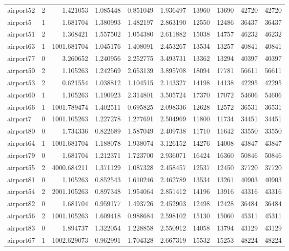 \begin{longtable}{|l|r|r|r|r|r|r|r|r|r|}
airport52 & 2 & 1.421053 & 1.085448 & 0.851049 & 1.936497 & 13960 & 13690 & 42720 & 42720 \\
airport5 & 1 & 1.681704 & 1.380993 & 1.482197 & 2.863190 & 12550 & 12486 & 36437 & 36437 \\
airport51 & 2 & 1.368421 & 1.557502 & 1.054380 & 2.611882 & 15038 & 14757 & 46232 & 46232 \\
airport63 & 1 & 1001.681704 & 1.045176 & 1.408091 & 2.453267 & 13534 & 13257 & 40841 & 40841 \\
airport77 & 0 & 3.260652 & 1.240956 & 2.252775 & 3.493731 & 13362 & 13294 & 40397 & 40397 \\
airport50 & 2 & 1.105263 & 1.242569 & 2.653139 & 3.895708 & 18094 & 17781 & 56611 & 56611 \\
airport53 & 2 & 0.621554 & 1.038812 & 1.104515 & 2.143327 & 14198 & 14138 & 42295 & 42295 \\
airport60 & 1 & 1.105263 & 1.190923 & 2.314801 & 3.505724 & 17370 & 17072 & 54606 & 54606 \\
airport66 & 1 & 1001.789474 & 1.402511 & 0.695825 & 2.098336 & 12628 & 12572 & 36531 & 36531 \\
airport7 & 0 & 1001.105263 & 1.227278 & 1.277691 & 2.504969 & 11800 & 11734 & 34451 & 34451 \\
airport80 & 0 & 1.734336 & 0.822689 & 1.587049 & 2.409738 & 11710 & 11642 & 33550 & 33550 \\
airport64 & 1 & 1001.681704 & 1.188078 & 1.938074 & 3.126152 & 14276 & 14008 & 43847 & 43847 \\
airport79 & 0 & 1.681704 & 1.212371 & 1.723700 & 2.936071 & 16424 & 16360 & 50846 & 50846 \\
airport55 & 2 & 4000.684211 & 1.371129 & 1.087328 & 2.458457 & 12537 & 12450 & 37720 & 37720 \\
airport81 & 0 & 1.105263 & 0.852543 & 1.610246 & 2.462789 & 13534 & 13261 & 40903 & 40903 \\
airport54 & 2 & 2001.105263 & 0.897348 & 1.954064 & 2.851412 & 14196 & 13916 & 43316 & 43316 \\
airport82 & 0 & 1.681704 & 0.959177 & 1.493726 & 2.452903 & 12498 & 12428 & 36484 & 36484 \\
airport56 & 2 & 1001.105263 & 1.609418 & 0.988684 & 2.598102 & 15130 & 15060 & 45311 & 45311 \\
airport83 & 0 & 1.894737 & 1.322054 & 1.228858 & 2.550912 & 14058 & 13794 & 43129 & 43129 \\
airport67 & 1 & 1002.629073 & 0.962991 & 1.704328 & 2.667319 & 15532 & 15253 & 48224 & 48224 \\

\end{longtable}
